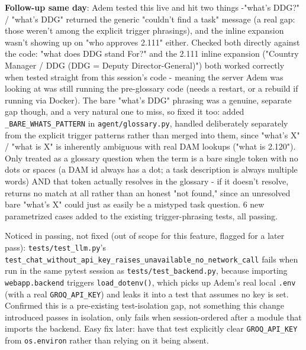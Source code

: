 \textbf{Follow-up same day}: Adem tested this live and hit two things -"what's DDG?" / "what's DDG" returned the generic "couldn't find a task" message (a real gap: those weren't among the explicit trigger phrasings), and the inline expansion wasn't showing up on "who approves 2.111" either. Checked both directly against the code: "what does DDG stand For?" and the 2.111 inline expansion ("Country Manager / DDG (DDG = Deputy Director-General)") both worked correctly when tested straight from this session's code - meaning the server Adem was looking at was still running the pre-glossary code (needs a restart, or a rebuild if running via Docker). The bare "what's DDG" phrasing was a genuine, separate gap though, and a very natural one to miss, so fixed it too: added \texttt{\_\allowbreak{}BARE\_\allowbreak{}WHATS\_\allowbreak{}PATTERN} in \texttt{agent/\allowbreak{}glossary.py}, handled deliberately separately from the explicit trigger patterns rather than merged into them, since "what's X" / "what is X" is inherently ambiguous with real DAM lookups ("what is 2.120"). Only treated as a glossary question when the term is a bare single token with no dots or spaces (a DAM id always has a dot; a task description is always multiple words) AND that token actually resolves in the glossary - if it doesn't resolve, returns no match at all rather than an honest "not found," since an unresolved bare "what's X" could just as easily be a mistyped task question. 6 new parametrized cases added to the existing trigger-phrasing tests, all passing.

Noticed in passing, not fixed (out of scope for this feature, flagged for a later pass): \texttt{tests/\allowbreak{}test\_\allowbreak{}llm.py}'s \texttt{test\_\allowbreak{}chat\_\allowbreak{}without\_\allowbreak{}api\_\allowbreak{}key\_\allowbreak{}raises\_\allowbreak{}unavailable\_\allowbreak{}no\_\allowbreak{}network\_\allowbreak{}call} fails when run in the same pytest session as \texttt{tests/\allowbreak{}test\_\allowbreak{}backend.py}, because importing \texttt{webapp.backend} triggers \texttt{load\_\allowbreak{}dotenv()}, which picks up Adem's real local \texttt{.env} (with a real \texttt{GROQ\_\allowbreak{}API\_\allowbreak{}KEY}) and leaks it into a test that assumes no key is set. Confirmed this is a pre-existing test-isolation gap, not something this change introduced passes in isolation, only fails when session-ordered after a module that imports the backend. Easy fix later: have that test explicitly clear \texttt{GROQ\_\allowbreak{}API\_\allowbreak{}KEY} from \texttt{os.environ} rather than relying on it being absent.


